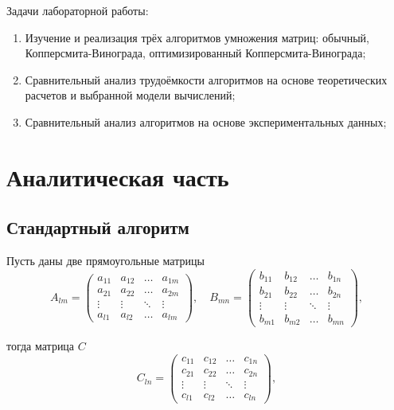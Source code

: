 \documentclass[12pt]{report}
\begin{document}
Задачи лабораторной работы:

\begin{enumerate}

	\item Изучение и реализация трёх алгоритмов умножения матриц: обычный, Копперсмита-Винограда, оптимизированный Копперсмита-Винограда;
	\item Сравнительный анализ трудоёмкости алгоритмов на основе теоретических расчетов и выбранной модели вычислений;
	\item Сравнительный анализ алгоритмов на основе экспериментальных данных;

\end{enumerate}

\chapter{Аналитическая часть}


\section{Стандартный алгоритм}

Пусть даны две прямоугольные матрицы
\begin{equation}
	A_{lm} = \begin{pmatrix}
		a_{11} & a_{12} & \ldots & a_{1m}\\
		a_{21} & a_{22} & \ldots & a_{2m}\\
		\vdots & \vdots & \ddots & \vdots\\
		a_{l1} & a_{l2} & \ldots & a_{lm}
	\end{pmatrix},
	\quad
		B_{mn} = \begin{pmatrix}
		b_{11} & b_{12} & \ldots & b_{1n}\\
		b_{21} & b_{22} & \ldots & b_{2n}\\
		\vdots & \vdots & \ddots & \vdots\\
		b_{m1} & b_{m2} & \ldots & b_{mn}
	\end{pmatrix},
\end{equation}

тогда матрица $C$
\begin{equation}
	C_{ln} = \begin{pmatrix}
		c_{11} & c_{12} & \ldots & c_{1n}\\
		c_{21} & c_{22} & \ldots & c_{2n}\\
		\vdots & \vdots & \ddots & \vdots\\
		c_{l1} & c_{l2} & \ldots & c_{ln}
	\end{pmatrix},
\end{equation}
\end{document}
